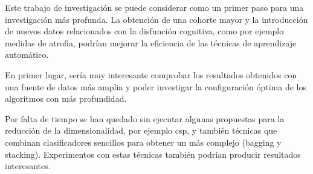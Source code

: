 Este trabajo de investigación se puede considerar como un primer paso para una investigación más profunda. La obtención de una cohorte mayor y la introducción de nuevos datos relacionados con la disfunción cognitiva, como por ejemplo medidas de atrofia, podrían mejorar la eficiencia de las técnicas de aprendizaje automático. 

En primer lugar, sería muy interesante comprobar los resultados obtenidos con una fuente de datos más amplia y poder investigar la configuración óptima de los algoritmos con más profundidad. 

Por falta de tiempo se han quedado sin ejecutar algunas propuestas para la reducción de la dimensionalidad, por ejemplo \gls{csp}, y también técnicas que combinan clasificadores sencillos para obtener un más complejo (bagging y stacking). Experimentos con estas técnicas también podrían producir resultados interesantes.
